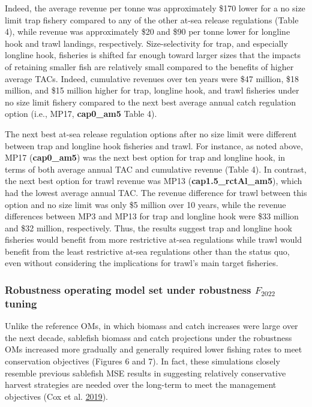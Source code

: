 \documentclass[11pt]{book}
\begin{document}
Indeed, the average revenue per tonne was approximately \$170 lower for a no size limit trap fishery compared to any of the other at-sea release regulations (Table 4), while revenue was approximately \$20 and \$90 per tonne lower for longline hook and trawl landings, respectively. Size-selectivity for trap, and especially longline hook, fisheries is shifted far enough toward larger sizes that the impacts of retaining smaller fish are relatively small compared to the benefits of higher average TACs. Indeed, cumulative revenues over ten years were \$47 million, \$18 million, and \$15 million higher for trap, longline hook, and trawl fisheries under no size limit fishery compared to the next best average annual catch regulation option (i.e., MP17, \textbf{cap0\_am5} Table 4).

The next best at-sea release regulation options after no size limit were different between trap and longline hook fisheries and trawl. For instance, as noted above, MP17 (\textbf{cap0\_am5}) was the next best option for trap and longline hook, in terms of both average annual TAC and cumulative revenue (Table 4). In contrast, the next best option for trawl revenue was MP13 (\textbf{cap1.5\_rctAl\_am5}), which had the lowest average annual TAC. The revenue difference for trawl between this option and no size limit was only \$5 million over 10 years, while the revenue differences between MP3 and MP13 for trap and longline hook were \$33 million and \$32 million, respectively. Thus, the results suggest trap and longline hook fisheries would benefit from more restrictive at-sea regulations while trawl would benefit from the least restrictive at-sea regulations other than the status quo, even without considering the implications for trawl's main target fisheries.

\hypertarget{robustness-operating-model-set-under-robustness-f_2022-tuning}{%
\subsubsection{\texorpdfstring{Robustness operating model set under robustness \(F_{2022}\) tuning}{Robustness operating model set under robustness F\_\{2022\} tuning}}\label{robustness-operating-model-set-under-robustness-f_2022-tuning}}

Unlike the reference OMs, in which biomass and catch increases were large over the next decade, sablefish biomass and catch projections under the robustness OMs increased more gradually and generally required lower fishing rates to meet conservation objectives (Figures 6 and 7). In fact, these simulations closely resemble previous sablefish MSE results in suggesting relatively conservative harvest strategies are needed over the long-term to meet the management objectives (Cox et al. \protect\hyperlink{ref-cox2019evaluating}{2019}).
\end{document}
